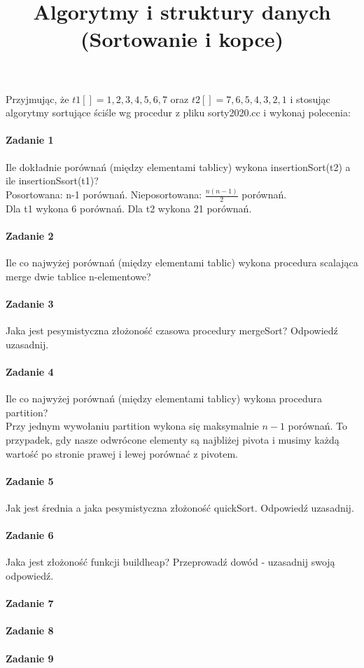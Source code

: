 \documentclass[18pt]{extarticle}
\begin{document}
\large
{}\selectfont

\title{Algorytmy i struktury danych (Sortowanie i kopce)}
\date{}
\maketitle

Przyjmując, że $t1[]={1,2,3,4,5,6,7}$ oraz $t2[]={7,6,5,4,3,2,1}$ i stosując algorytmy sortujące ściśle wg procedur z pliku sorty2020.cc i wykonaj polecenia:

\paragraph{Zadanie 1} Ile dokładnie porównań (między elementami  tablicy) wykona insertionSort(t2) a ile insertionSsort(t1)? \\

Posortowana: n-1 porównań. Nieposortowana: $\frac{n(n-1)}{2}$ porównań. \\
Dla t1 wykona 6 porównań. Dla t2 wykona 21 porównań.

\paragraph{Zadanie 2} Ile co najwyżej porównań (między elementami tablic) wykona procedura scalająca merge dwie tablice n-elementowe? \\


\paragraph{Zadanie 3} Jaka jest pesymistyczna złożoność czasowa procedury mergeSort? Odpowiedź uzasadnij. \\


\paragraph{Zadanie 4} Ile co najwyżej porównań (między elementami tablicy) wykona procedura partition? \\


Przy jednym wywołaniu partition wykona się maksymalnie $n-1$ porównań. To przypadek, gdy nasze odwrócone elementy są najbliżej pivota i musimy każdą wartość po stronie prawej i lewej porównać z pivotem.

\paragraph{Zadanie 5} Jak jest średnia a jaka pesymistyczna złożoność quickSort. Odpowiedź uzasadnij.

\paragraph{Zadanie 6} Jaka jest złożoność funkcji buildheap? Przeprowadź dowód - uzasadnij swoją odpowiedź.

\paragraph{Zadanie 7} 

\paragraph{Zadanie 8} 

\paragraph{Zadanie 9} 
\end{document}

